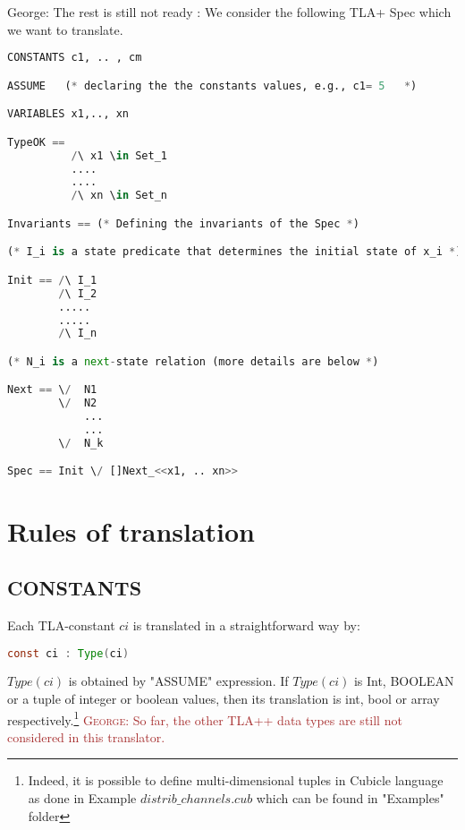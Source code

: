 \documentclass{article}
\theoremstyle{plain}
\numberwithin{equation}{section}
\newcommand{\george}[1]{\textcolor{brown}{\textsc{George: } {\sf #1}}}
\begin{document}
\fi   



\iffalse    




\color{red} George: The rest is still not ready : 
We consider the following TLA+ Spec which we want to translate.

\begin{lstlisting}[language=Python]
CONSTANTS c1, .. , cm

ASSUME   (* declaring the the constants values, e.g., c1= 5   *)  

VARIABLES x1,.., xn

TypeOK == 
          /\ x1 \in Set_1
          ....
          ....
          /\ xn \in Set_n

Invariants == (* Defining the invariants of the Spec *)           

(* I_i is a state predicate that determines the initial state of x_i *)

Init == /\ I_1    
        /\ I_2 
        .....
        .....
        /\ I_n 

(* N_i is a next-state relation (more details are below *)

Next == \/  N1 
        \/  N2 
            ...
            ...
        \/  N_k 

Spec == Init \/ []Next_<<x1, .. xn>>        
\end{lstlisting}
 

\section*{Rules of translation}

 







\subsection{CONSTANTS} Each TLA-constant $ci$ is  translated in a straightforward  way  by:  
   
\begin{lstlisting}[language=Java]
const ci : Type(ci) 
\end{lstlisting}

\emph{$Type(ci)$} is obtained by "ASSUME" expression. If \emph{$Type(ci)$} is Int, BOOLEAN or a tuple of integer or boolean values, then its translation is int,  bool or array respectively.\footnote{Indeed, it is possible to define multi-dimensional tuples in Cubicle language as done in Example \emph{$distrib\_channels.cub$} which can be found in "Examples" folder} \george{So far, the other TLA++ data types are still not considered in this translator.  }  
\end{document}
